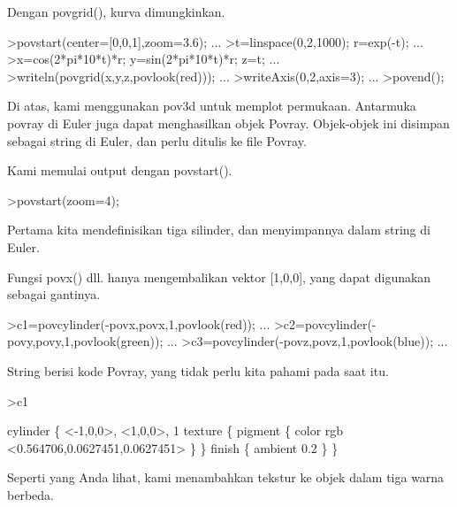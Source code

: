 \documentclass{article}
\begin{document}
\begin{eulernotebook}
\begin{eulerprompt}
\end{eulerprompt}
\begin{eulercomment}
Dengan povgrid(), kurva dimungkinkan.
\end{eulercomment}
\begin{eulerprompt}
>povstart(center=[0,0,1],zoom=3.6); ...
>t=linspace(0,2,1000); r=exp(-t); ...
>x=cos(2*pi*10*t)*r; y=sin(2*pi*10*t)*r; z=t; ...
>writeln(povgrid(x,y,z,povlook(red))); ...
>writeAxis(0,2,axis=3); ...
>povend();
\end{eulerprompt}
\begin{eulercomment}
Di atas, kami menggunakan pov3d untuk memplot permukaan. Antarmuka
povray di Euler juga dapat menghasilkan objek Povray. Objek-objek ini
disimpan sebagai string di Euler, dan perlu ditulis ke file Povray.

Kami memulai output dengan povstart().
\end{eulercomment}
\begin{eulerprompt}
>povstart(zoom=4);
\end{eulerprompt}
\begin{eulercomment}
Pertama kita mendefinisikan tiga silinder, dan menyimpannya dalam
string di Euler.

Fungsi povx() dll. hanya mengembalikan vektor [1,0,0], yang dapat
digunakan sebagai gantinya.
\end{eulercomment}
\begin{eulerprompt}
>c1=povcylinder(-povx,povx,1,povlook(red)); ...
>c2=povcylinder(-povy,povy,1,povlook(green)); ...
>c3=povcylinder(-povz,povz,1,povlook(blue)); ...
\end{eulerprompt}
\begin{eulercomment}
String berisi kode Povray, yang tidak perlu kita pahami pada saat itu.
\end{eulercomment}
\begin{eulerprompt}
>c1
\end{eulerprompt}
\begin{euleroutput}
  cylinder \{ <-1,0,0>, <1,0,0>, 1
   texture \{ pigment \{ color rgb <0.564706,0.0627451,0.0627451> \}  \} 
   finish \{ ambient 0.2 \} 
   \}
\end{euleroutput}
\begin{eulercomment}
Seperti yang Anda lihat, kami menambahkan tekstur ke objek dalam tiga
warna berbeda.


\end{eulercomment}
\end{eulernotebook}
\end{document}
